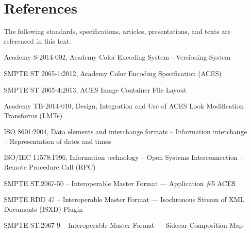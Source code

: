 \numberedformat
\chapter{References}
The following standards, specifications, articles, presentations, and texts are referenced in this text:

Academy S-2014-002, Academy Color Encoding System - Versioning System 

SMPTE ST 2065-1:2012, Academy Color Encoding Specification (ACES)

SMPTE ST 2065-4:2013, ACES Image Container File Layout

Academy TB-2014-010, Design, Integration and Use of ACES Look Modification Transforms (LMTs)

ISO 8601:2004, Data elements and interchange formats -- Information interchange -- Representation of dates and times

ISO/IEC 11578:1996, Information technology -- Open Systems Interconnection -- Remote Procedure Call (RPC)

SMPTE ST.2067-50 -- Interoperable Master Format --- Application \#5 ACES

SMPTE RDD 47 -- Interoperable Master Format --- Isochronous Stream of XML Documents (ISXD) Plugin
 
SMPTE ST.2067-9 -- Interoperable Master Format --- Sidecar Composition Map

